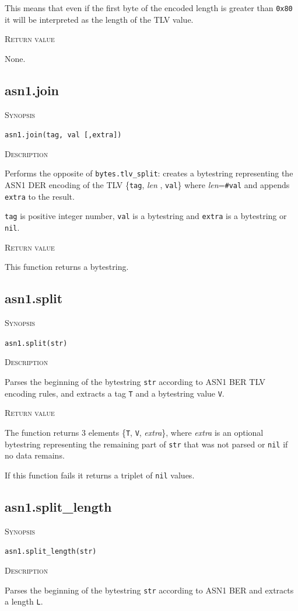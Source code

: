 \documentclass[11pt]{report}
\newcommand{\mansection}[1]{\vspace{0.5em}\par\noindent\textsc{#1}\vspace{0.5em}\par}
\newcommand{\syn}[1]{\texttt{#1}}
\begin{document}
  This means that even if the first byte of the encoded length is greater 
  than \syn{0x80} it will be interpreted as the length of the TLV value.

\mansection{Return value}
  None.

\subsection{asn1.join}

\mansection{Synopsis}
\syn{asn1.join(tag, val [,extra])}

\mansection{Description}
  Performs the opposite of \syn{bytes.tlv\_split}: creates a bytestring 
  representing the ASN1 DER encoding of the TLV \{\syn{tag}, \textit{len} , \syn{val}\} where \textit{len}=\syn{\#val} 
  and appends \syn{extra} to the result.

  \syn{tag} is positive integer number, \syn{val} is a bytestring and 
  \syn{extra} is a bytestring or \syn{nil}.

\mansection{Return value}
  This function returns a bytestring.

\subsection{asn1.split}

\mansection{Synopsis}
\syn{asn1.split(str)}

\mansection{Description}
  Parses the beginning of the bytestring \syn{str} according to ASN1 BER 
  TLV encoding rules, and extracts a tag \syn{T} and a bytestring value \syn{V}.

\mansection{Return value}
  The function returns 3 elements \{\syn{T}, \syn{V}, \textit{extra}\}, 
  where \textit{extra} is an optional bytestring representing the remaining part of 
  \syn{str} that was not parsed or \syn{nil} if no data remains.

  If this function fails it returns a triplet of \syn{nil} values.


\subsection{asn1.split\_length}

\mansection{Synopsis}
\syn{asn1.split\_length(str)}

\mansection{Description}
  Parses the beginning of the bytestring \syn{str} according to ASN1 BER 
  and extracts a length \syn{L}. 
\end{document}
